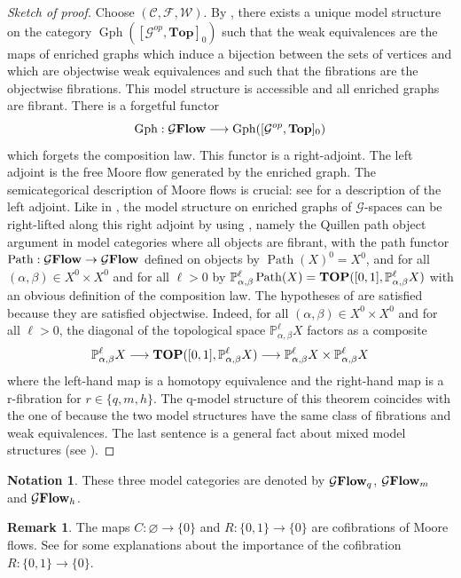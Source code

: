 \documentclass[a4paper,12pt]{amsart}
\newcommand{\C}{\mathcal{C}}
\newcommand{\W}{\mathcal{W}}
\newcommand{\F}{\mathcal{F}}
\newcommand{\p}{\times}
\renewcommand{\P}{\mathbb{P}}
\newcommand{\bpf}{\begin{proof}}
\newcommand{\epf}{\end{proof}}
\theoremstyle{definition}
\newtheorem{rem}[thm]{Remark}
\newtheorem{nota}[thm]{Notation}
\renewcommand{\top}{{\mathbf{Top}}}
\newcommand{\brm}[1]{{\rm{\mathbf{#1}}}}
\newcommand{\dtopG}{{\mathcal{G}\brm{Flow}}}
\newcommand{\ttop}{{\brm{TOP}}}
\newcommand{\topdgr}{[\mathcal{G}^{op},\top]}
\renewcommand{\P}{\mathbb{P}}
\DeclareMathOperator{\pf}{{Gph}}
\DeclareMathOperator{\cocyl}{{Path}}
\begin{document}
\bpf[Sketch of proof]
Choose $(\C,\F,\W)$. By \cite[Corollary~5.6]{QHMmodel}, there exists a unique model structure on the category $\pf(\topdgr_0)$ such that the weak equivalences are the maps of enriched graphs which induce a bijection between the sets of vertices and which are objectwise weak equivalences and such that the fibrations are the objectwise fibrations. This model structure is accessible and all enriched graphs are fibrant. There is a forgetful functor \[\pf:\dtopG\longrightarrow\pf(\topdgr_0)\] which forgets the composition law. This functor is a right-adjoint. The left adjoint is the free Moore flow generated by the enriched graph. The semicategorical description of Moore flows is crucial: see \cite[Proposition~7.3]{QHMmodel} for a description of the left adjoint. Like in \cite[Theorem~7.4]{QHMmodel}, the model structure on enriched graphs of $\mathcal{G}$-spaces can be right-lifted along this right adjoint by using \cite[Theorem~2.1]{QHMmodel}, namely the Quillen path object argument in model categories where all objects are fibrant, with the path functor $\cocyl:\dtopG\to\dtopG$ defined on objects by $\cocyl(X)^0=X^0$, and for all $(\alpha,\beta)\in X^0\p X^0$ and for all $\ell>0$ by $\P_{\alpha,\beta}^\ell\cocyl(X) = \ttop([0,1],\P_{\alpha,\beta}^\ell X)$ with an obvious definition of the composition law. The hypotheses of \cite[Theorem~2.1]{QHMmodel} are satisfied because they are satisfied objectwise. Indeed, for all $(\alpha,\beta)\in X^0\p X^0$ and for all $\ell>0$, the diagonal of the topological space $\P_{\alpha,\beta}^\ell X$ factors as a composite \[\P_{\alpha,\beta}^\ell X \longrightarrow \ttop([0,1],\P_{\alpha,\beta}^\ell X) \longrightarrow \P_{\alpha,\beta}^\ell X\p \P_{\alpha,\beta}^\ell X\] where the left-hand map is a homotopy equivalence and the right-hand map is a r-fibration for $r\in\{q,m,h\}$. The q-model structure of this theorem coincides with the one of \cite[Theorem~8.8]{Moore1} because the two model structures have the same class of fibrations and weak equivalences. The last sentence is a general fact about mixed model structures (see \cite[Theorem~2.1 and Proposition~3.6]{mixed-cole}).
\epf

\begin{nota}
	These three model categories are denoted by $\dtopG_q$, $\dtopG_m$ and $\dtopG_h$.
\end{nota}


\begin{rem}
	The maps $C:\varnothing \to \{0\}$ and $R:\{0,1\}\to \{0\}$ are cofibrations of Moore flows. See \cite{Nonunital} for some explanations about the importance of the cofibration $R:\{0,1\}\to \{0\}$.
\end{rem}
\end{document}

